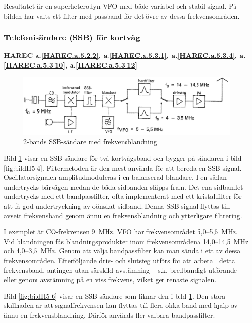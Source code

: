 Resultatet är en superheterodyn-VFO med både variabel och stabil
signal.
På bilden har valts ett filter med passband för det övre av dessa
frekvensområden.

\subsubsection{Telefonisändare (SSB) för kortvåg}
\textbf{HAREC
 a.\ref{HAREC.a.5.2.2}\label{myHAREC.a.5.2.2},
 a.\ref{HAREC.a.5.3.1}\label{myHAREC.a.5.3.1},
 a.\ref{HAREC.a.5.3.4}\label{myHAREC.a.5.3.4},
 a.\ref{HAREC.a.5.3.10}\label{myHAREC.a.5.3.10},
 a.\ref{HAREC.a.5.3.12}\label{myHAREC.a.5.3.12}
}

\begin{figure}
  \includegraphics[width=\textwidth]{images/cropped_pdfs/bild_2_5-05.pdf}
  \caption{2-bands SSB-sändare med frekvensblandning}
  \label{fig:bildII5-5}
\end{figure}

Bild \ref{fig:bildII5-5} visar en SSB-sändare för två kortvågsband och
bygger på sändaren i bild \ref{fig:bildII5-4}.
Filtermetoden är den mest använda för att bereda en SSB-signal.
Oscillatorsignalen amplitudmoduleras i en balanserad blandare.
I en sådan undertrycks bärvågen medan de båda sidbanden släpps fram.
Det ena sidbandet undertrycks med ett bandpassfilter, ofta implementerat med
ett kristallfilter för att få god undertryckning av oönskat sidband.
Denna SSB-signal flyttas till avsett frekvensband
genom ännu en frekvensblandning och ytterligare filtrering.

I exemplet är CO-frekvensen 9~MHz. VFO har frekvensområdet 5,0--5,5~MHz.
Vid blandningen fås blandningsprodukter inom frekvensområdena
14,0--14,5~MHz och 4,0--3,5~MHz.
Genom att välja bandpassfilter kan man sända i ett av dessa frekvensområden.
Efterföljande driv- och slutsteg utförs för att arbeta i detta frekvensband,
antingen utan särskild avstämning -- s.k. bredbandigt utförande -- eller genom
avstämning på en viss frekvens, vilket ger renaste signalen.

Bild \ref{fig:bildII5-6} visar en SSB-sändare som liknar den i
bild \ref{fig:bildII5-5}.
Den stora skillnaden är att signalfrekvensen kan flyttas till flera olika band
med hjälp av ännu en frekvensblandning.
Därför används fler valbara bandpassfilter.

